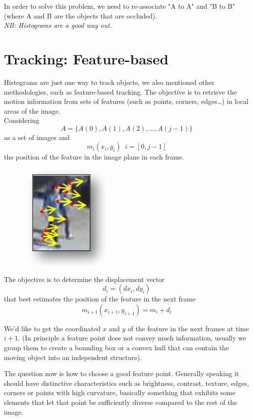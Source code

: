 In order to solve this problem, we need to re-associate "A to A" and "B to B" (where A and B are the objects that are occluded). 
\\\textit{NB: Histograms are a good way out.}

\section{Tracking: Feature-based}

Histograms are just one way to track objects, we also mentioned other methodologies, such as feature-based tracking. The objective is to retrieve the motion information from sets of features (such as points, corners, edges\dots) in local areas of the image.
\\Considering
\[
    A = \{A(0), A(1), A(2), \dots, A(j-1)\}
\] 
as a set of images and
\[
    m_i(x_i, y_i)\;\;i = [0, j-1] 
\] 
the position of the feature in the image plane in each frame.

\begin{figure}
    \includegraphics[scale=0.3]{Figures/Tracking.png}
\end{figure}
The objective is to determine the displacement vector 
\[
    d_i = (dx_i, dy_i)
\] 
that best estimates the position of the feature in the next frame 
\[
    m_{i+1}(x_{i+1}, y_{i+1}) = m_i + d_i
\]

We'd like to get the coordinated \(x\) and \(y\) of the feature in the next frames at time \(i+1\).
(In principle a feature point does not convey much information, usually we group them to create a bounding box or a convex hull that can contain the moving object into an independent structure).

The question now is how to choose a good feature point. Generally speaking it should have distinctive characteristics such as brightness, contrast, texture, edges, corners or points with high curvature, basically something that exhibits some elements that let that point be sufficiently diverse compared to the rest of the image.

